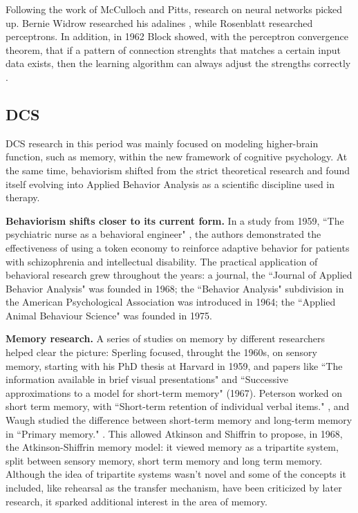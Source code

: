 \documentclass[../main.tex]{subfiles}
\begin{document}
Following the work of McCulloch and Pitts, research on neural networks picked up. Bernie Widrow researched his adalines \parencite{widrowAssociativeStorageRetrieval1962}, while Rosenblatt researched perceptrons. In addition, in 1962 Block showed, with the perceptron convergence theorem, that if a pattern of connection strenghts that matches a certain input data exists, then the learning algorithm can always adjust the strengths correctly \parencite{russellArtificialIntelligenceModern2002}.

\subsection{DCS}
DCS research in this period was mainly focused on modeling higher-brain function, such as memory, within the new framework of cognitive psychology. At the same time, behaviorism shifted from the strict theoretical research and found itself evolving into Applied Behavior Analysis as a scientific discipline used in therapy.

\vspace{4pt}
\textbf{Behaviorism shifts closer to its current form.}
In a study from 1959, ``The psychiatric nurse as a behavioral engineer" \parencite{ayllonPsychiatricNurseBehavioral1959}, the authors demonstrated the effectiveness of using a token economy to reinforce adaptive behavior for patients with schizophrenia and intellectual disability. The practical application of behavioral research grew throughout the years: a journal, the ``Journal of Applied Behavior Analysis" was founded in 1968; the ``Behavior Analysis" subdivision in the American Psychological Association was introduced in 1964; the ``Applied Animal Behaviour Science" was founded in 1975.

\vspace{4pt}
\textbf{Memory research.}
A series of studies on memory by different researchers helped clear the picture: Sperling focused, throught the 1960s, on sensory memory, starting with his PhD thesis at Harvard in 1959, and papers like ``The information available in brief visual presentations" \parencite{sperlingInformationAvailableBrief1960} and ``Successive approximations to a model for short-term memory" (1967). Peterson worked on short term memory, with ``Short-term retention of individual verbal items." \parencite{petersonShorttermRetentionIndividual1959}, and Waugh studied the difference between short-term memory and long-term memory in ``Primary memory." \parencite{waughPrimaryMemory1965}. This allowed Atkinson and Shiffrin to propose, in 1968, the Atkinson-Shiffrin memory model: it viewed memory as a tripartite system, split between sensory memory, short term memory and long term memory. Although the idea of tripartite systems wasn't novel  \parencite{jamesPrinciplesPsychology1890} and some of the concepts it included, like rehearsal as the transfer mechanism, have been criticized by later research, it sparked additional interest in the area of memory.
\end{document}
